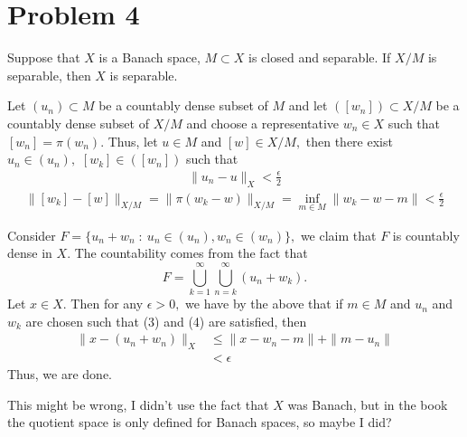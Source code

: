 \documentclass[11pt]{article}
\begin{document}
\section*{Problem 4}
\begin{problem}
    Suppose that $X$ is a Banach space, $M\subset X$ is closed and separable. If $X/M$ is separable, then $X$ is separable.
\end{problem}
\begin{solution}
    Let $(u_n)\subset M$ be a countably dense subset of $M$ and let $([w_n])\subset X/M$ be a countably dense subset of $X/M$ and choose a representative $w_n \in X$ such that $[w_n] = \pi(w_n).$ Thus, let $u \in M$ and $[w] \in X/M,$ then there exist $u_n\in (u_n),$ $[w_k]\in ([w_n])$ such that 
    \begin{align}
        \|u_n - u\|_X< \frac{\epsilon}{2}
    \end{align}
    \begin{align}
        \|[w_k] - [w]\|_{X/M} = \|\pi(w_k - w)\|_{X/M} = \inf_{m\in M}\|w_k - w - m\|< \frac{\epsilon}{2}
    \end{align}

    Consider $F = \{u_n + w_n \; : \: u_n \in (u_n), w_n \in (w_n)\},$ we claim that $F$ is countably dense in $X.$ The countability comes from the fact that 
    \[F = \bigcup_{k=1}^\infty\bigcup_{n=k}^\infty (u_n + w_k).\] Let $x\in X.$ Then for any $\epsilon>0,$ we have by the above that if $m\in M$ and $u_n$ and $w_k$ are chosen such that (3) and (4) are satisfied, then
    \begin{align*}
        \|x - (u_n + w_n)\|_X &\leq \|x - w_n - m\| + \|m - u_n\|\\
        &< \epsilon
    \end{align*}
    Thus, we are done.
\end{solution}
\begin{reflection}
    This might be wrong, I didn't use the fact that $X$ was Banach, but in the book the quotient space is only defined for Banach spaces, so maybe I did?
\end{reflection}
\end{document}

